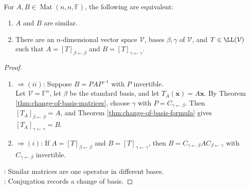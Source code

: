 \begin{corollary} \label{cor:similar-iff-same-linear-operator} \\
For $A,B\in\operatorname{Mat}(n,n,\mathbb{F})$, the following are equivalent:
\begin{enumerate}[label=(\roman*)]
\setlength{\itemsep}{0pt}
\item $A$ and $B$ are similar.
\item There are an $n$-dimensional vector space $\mathcal{V}$, bases $\beta,\gamma$ of $\mathcal{V}$, and $T\in\LL(\mathcal{V})$ such that $A=[T]_{\beta \leftarrow \beta}$ and $B=[T]_{\gamma \leftarrow \gamma}$.
\end{enumerate}
\begin{proof}
\begin{enumerate}[label=(\roman)*.]
\setlength{\itemsep}{0pt}
\item[$(i)$] $\Rightarrow (ii)$: Suppose $B=PAP^{-1}$ with $P$ invertible.\\
Let $\mathcal{V}=\mathbb{F}^n$, let $\beta$ be the standard basis, and let $T_A(\mathbf{x})=A\mathbf{x}$. By Theorem \ref{thm:change-of-basis-matrices}, choose $\gamma$ with $P=C_{\gamma \leftarrow \beta}$. Then $[T_A]_{\beta \leftarrow \beta}=A$, and Theorem \ref{thm:change-of-basis-formula} gives $[T_A]_{\gamma \leftarrow \gamma}=B$.
\item[$(ii)$] $\Rightarrow (i)$: If $A=[T]_{\beta \leftarrow \beta}$ and $B=[T]_{\gamma \leftarrow \gamma}$, then $B=C_{\gamma \leftarrow \beta}AC_{\beta \leftarrow \gamma}$ with $C_{\gamma \leftarrow \beta}$ invertible.
\end{enumerate}
: Similar matrices are one operator in different bases.\\
: Conjugation records a change of basis.
\end{proof}
\end{corollary}

